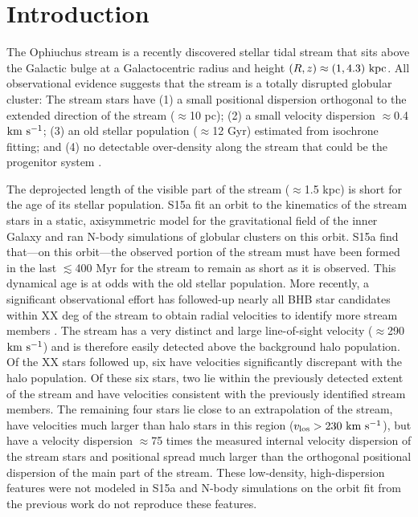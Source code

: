 \documentclass[letterpaper,12pt,preprint]{aastex}
\begin{document}

\section{Introduction}\label{sec:introduction}

The Ophiuchus stream \citep{bernard14, sesar15a} is a recently discovered stellar tidal stream that sits above the Galactic bulge at a Galactocentric radius and height $(R,z) \approx (1, 4.3)~{\rm kpc}$. All observational evidence suggests that the stream is a totally disrupted globular cluster: The stream stars have (1) a small positional dispersion orthogonal to the extended direction of the stream ($\approx$10 pc); (2) a small velocity dispersion $\approx$0.4 ${\rm km}~{\rm s}^{-1}$; (3) an old stellar population ($\approx$12 Gyr) estimated from isochrone fitting; and (4) no detectable over-density along the stream that could be  the progenitor system \citep[][hereafter S15a]{sesar15a}. 

The deprojected length of the visible part of the stream ($\approx$1.5 kpc) is short for the age of its stellar population. S15a fit an orbit to the kinematics of the stream stars in a static, axisymmetric model for the gravitational field of the inner Galaxy and ran N-body simulations of globular clusters on this orbit. S15a find that---on this orbit---the observed portion of the stream must have been formed in the last $\lesssim$400 Myr for the stream to remain as short as it is observed. This dynamical age is at odds with the old stellar population. More recently, a significant observational effort has followed-up nearly all BHB star candidates within XX deg of the stream to obtain radial velocities to identify more stream members \citep{sesar15b}. The stream has a very distinct and large line-of-sight velocity ($\approx$290 ${\rm km}~{\rm s}^{-1}$) and is therefore easily detected above the background halo population. Of the XX stars followed up, six have velocities significantly discrepant with the halo population. Of these six stars, two lie within the previously detected extent of the stream and have velocities consistent with the previously identified stream members. The remaining four stars lie close to an extrapolation of the stream, have velocities much larger than halo stars in this region ($v_{\rm los}>230~{\rm km}~{\rm s}^{-1}$), but have a velocity dispersion $\approx$75 times the measured internal velocity dispersion of the stream stars and positional spread much larger than the orthogonal positional dispersion of the main part of the stream. These low-density, high-dispersion features were not modeled in S15a and N-body simulations on the orbit fit from the previous work do not  reproduce these features.
\end{document}
